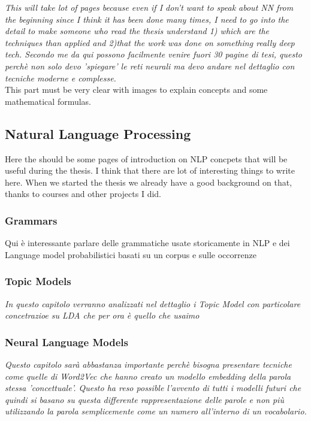 \textit{This will take lot of pages because even if I don't want to speak about NN from the beginning since I think it has been done many times, I need to go into the detail to make someone who read the thesis understand 1) which are the techniques than applied and 2)that the work was done on something really deep tech. Secondo me da qui possono facilmente venire fuori 30 pagine di tesi, questo perchè non solo devo 'spiegare' le reti neurali ma devo andare nel dettaglio con tecniche moderne e complesse.} \\
This part must be very clear with images to explain concepts and some mathematical formulas.

\subsection{Natural Language Processing}
Here the should be some pages of introduction on NLP concpets that will be useful during the thesis. I think that there are lot of interesting things to write here. When we started the thesis we already have a good background on that, thanks to courses and other projects I did.
\subsubsection{Grammars}
Qui è interessante parlare delle grammatiche usate storicamente in NLP e dei Language model probabilistici basati su un corpus e sulle occorrenze

\subsubsection{Topic Models}
\textit{In questo capitolo verranno analizzati nel dettaglio i Topic Model con particolare concetrazioe su LDA che per ora è quello che usaimo}

\subsubsection{Neural Language Models}
\textit{Questo capitolo sarà abbastanza importante perchè bisogna presentare tecniche come quelle di Word2Vec che hanno creato un modello embedding della parola stessa 'concettuale'. Questo ha reso possible l'avvento di tutti i modelli futuri che quindi si basano su questa differente rappresentazione delle parole e non più utilizzando la parola semplicemente come un numero all'interno di un vocabolario.
}

